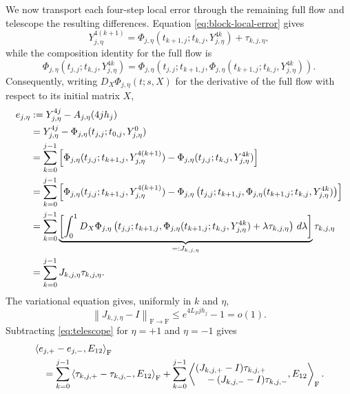 \documentclass[10pt,a4paper]{amsart}
\numberwithin{equation}{section}
\newcommand{\F}{\mathrm F}
\newcommand{\norm}[1]{\left\lVert #1\right\rVert}
\newcommand{\ip}[2]{\left\langle #1,#2\right\rangle_{\F}}
\begin{document}
We now transport each four-step local error through the remaining full
flow and telescope the resulting differences.  Equation
\eqref{eq:block-local-error} gives
\[
 Y_{j,\eta}^{4(k+1)}
 =\Phi_{j,\eta}(t_{k+1,j};t_{k,j},Y_{j,\eta}^{4k})
 +\tau_{k,j,\eta},
\]
while the composition identity for the full flow is
\[
 \Phi_{j,\eta}(t_{j,j};t_{k,j},Y_{j,\eta}^{4k})
 =\Phi_{j,\eta}\left(
 t_{j,j};t_{k+1,j},
 \Phi_{j,\eta}(t_{k+1,j};t_{k,j},Y_{j,\eta}^{4k})\right).
\]
Consequently, writing $D_X\Phi_{j,\eta}(t;s,X)$ for the derivative of
the full flow with respect to its initial matrix $X$,
\begin{align}
 e_{j,\eta}
 &:=Y_{j,\eta}^{4j}-A_{j,\eta}(4jh_j)\notag\\
 &=Y_{j,\eta}^{4j}
   -\Phi_{j,\eta}(t_{j,j};t_{0,j},Y_{j,\eta}^{0})\notag\\
 &=\sum_{k=0}^{j-1}\left[
 \Phi_{j,\eta}(t_{j,j};t_{k+1,j},Y_{j,\eta}^{4(k+1)})
 -\Phi_{j,\eta}(t_{j,j};t_{k,j},Y_{j,\eta}^{4k})\right]\notag\\
 &=\sum_{k=0}^{j-1}\left[
 \Phi_{j,\eta}(t_{j,j};t_{k+1,j},Y_{j,\eta}^{4(k+1)})
 -\Phi_{j,\eta}\left(
 t_{j,j};t_{k+1,j},
 \Phi_{j,\eta}(t_{k+1,j};t_{k,j},Y_{j,\eta}^{4k})\right)\right]
 \notag\\
 &=\sum_{k=0}^{j-1}\underbrace{\left[\int_0^1
 D_X\Phi_{j,\eta}
 \left(t_{j,j};t_{k+1,j},
 \Phi_{j,\eta}(t_{k+1,j};t_{k,j},Y_{j,\eta}^{4k})
 +\lambda\tau_{k,j,\eta}\right)\,d\lambda\right]}_{=:J_{k,j,\eta}}
 \tau_{k,j,\eta}\notag\\
 &=\sum_{k=0}^{j-1}J_{k,j,\eta}\tau_{k,j,\eta}.
 \label{eq:telescope}
\end{align}
The variational equation gives, uniformly in $k$ and $\eta$,
\begin{equation}\label{eq:transport-close}
 \norm{J_{k,j,\eta}-I}_{\F\to\F}
 \le e^{4L_Fjh_j}-1=o(1).
\end{equation}
Subtracting \eqref{eq:telescope} for $\eta=+1$ and $\eta=-1$ gives
\begin{align}
 &\ip{e_{j,+}-e_{j,-}}{E_{12}}\notag\\
 &\quad=\sum_{k=0}^{j-1}
 \ip{\tau_{k,j,+}-\tau_{k,j,-}}{E_{12}}
 +\sum_{k=0}^{j-1}
 \left\langle
 \begin{aligned}
 &(J_{k,j,+}-I)\tau_{k,j,+}\\[-1mm]
 &\quad -(J_{k,j,-}-I)\tau_{k,j,-}
 \end{aligned},E_{12}\right\rangle_{\F}.
 \label{eq:accumulation-decomposition}
\end{align}
\end{document}
